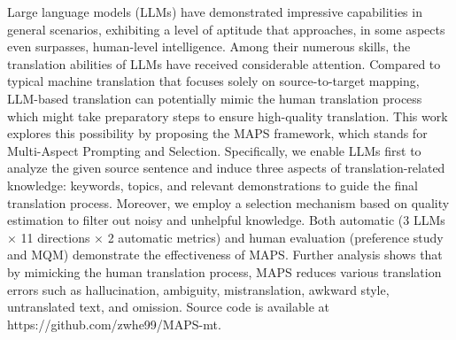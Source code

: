 Large language models (LLMs) have demonstrated impressive capabilities in general scenarios, exhibiting a level of aptitude that approaches, in some aspects even surpasses, human-level intelligence. Among their numerous skills, the translation abilities of LLMs have received considerable attention. Compared to typical machine translation that focuses solely on source-to-target mapping, LLM-based translation can potentially mimic the human translation process which might take preparatory steps to ensure high-quality translation. This work explores this possibility by proposing the MAPS framework, which stands for Multi-Aspect Prompting and Selection. Specifically, we enable LLMs first to analyze the given source sentence and induce three aspects of translation-related knowledge: keywords, topics, and relevant demonstrations to guide the final translation process. Moreover, we employ a selection mechanism based on quality estimation to filter out noisy and unhelpful knowledge. Both automatic (3 LLMs × 11 directions × 2 automatic metrics) and human evaluation (preference study and MQM) demonstrate the effectiveness of MAPS. Further analysis shows that by mimicking the human translation process, MAPS reduces various translation errors such as hallucination, ambiguity, mistranslation, awkward style, untranslated text, and omission. Source code is available at https://github.com/zwhe99/MAPS-mt.